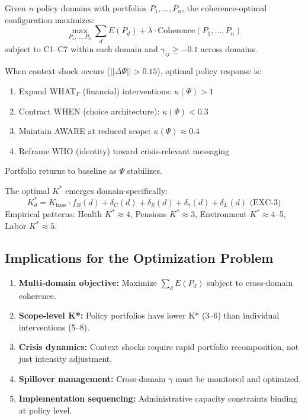 \begin{theorem}
Given $n$ policy domains with portfolios $P_1, \ldots, P_n$, the coherence-optimal configuration maximizes:
\begin{equation}
\max_{P_1, \ldots, P_n} \sum_{d} E(P_d) + \lambda \cdot \text{Coherence}(P_1, \ldots, P_n)
\end{equation}
subject to C1--C7 within each domain and $\gamma_{ij} \geq -0.1$ across domains.
\end{theorem}

\begin{theorem}
When context shock occurs ($||\Delta\Psi|| > 0.15$), optimal policy response is:
\begin{enumerate}[nosep]
\item Expand WHAT$_F$ (financial) interventions: $\kappa(\Psi) > 1$
\item Contract WHEN (choice architecture): $\kappa(\Psi) < 0.3$
\item Maintain AWARE at reduced scope: $\kappa(\Psi) \approx 0.4$
\item Reframe WHO (identity) toward crisis-relevant messaging
\end{enumerate}
Portfolio returns to baseline as $\Psi$ stabilizes.
\end{theorem}

\begin{theorem}
The optimal $K^*$ emerges domain-specifically:
\begin{equation}
K^*_d = K_{\text{base}} \cdot f_B(d) + \delta_C(d) + \delta_S(d) + \delta_\gamma(d) + \delta_L(d) \text{ (EXC-3)}
\end{equation}
Empirical patterns: Health $K^* \approx 4$, Pensions $K^* \approx 3$, Environment $K^* \approx 4$--5, Labor $K^* \approx 5$.
\end{theorem}

\subsection{Implications for the Optimization Problem}

\begin{enumerate}[nosep]
\item \textbf{Multi-domain objective:} Maximize $\sum_d E(P_d)$ subject to cross-domain coherence.
\item \textbf{Scope-level K*:} Policy portfolios have lower K* (3--6) than individual interventions (5--8).
\item \textbf{Crisis dynamics:} Context shocks require rapid portfolio recomposition, not just intensity adjustment.
\item \textbf{Spillover management:} Cross-domain $\gamma$ must be monitored and optimized.
\item \textbf{Implementation sequencing:} Administrative capacity constraints binding at policy level.
\end{enumerate}


